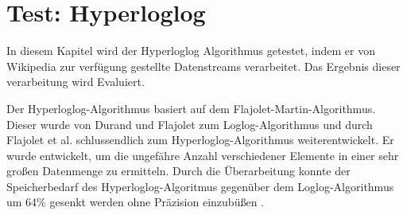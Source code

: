\section{Test: Hyperloglog}
In diesem Kapitel wird der Hyperloglog Algorithmus getestet, 
indem er von Wikipedia zur verfügung gestellte Datenstreams verarbeitet. 
Das Ergebnis dieser verarbeitung wird Evaluiert. 

Der Hyperloglog-Algorithmus basiert auf dem Flajolet-Martin-Algorithmus.
Dieser wurde von Durand und Flajolet \cite{durand2003} zum Loglog-Algorithmus 
und durch Flajolet et al. \cite{flajolet2007} schlussendlich zum Hyperloglog-Algorithmus weiterentwickelt.
Er wurde entwickelt, um die ungefähre Anzahl verschiedener Elemente in einer sehr großen Datenmenge zu ermitteln. 
Durch die Überarbeitung konnte der Speicherbedarf des Hyperloglog-Algoritmus 
gegenüber dem Loglog-Algorithmus um 64\% gesenkt werden ohne Präzision einzubüßen \cite{flajolet2007}. 